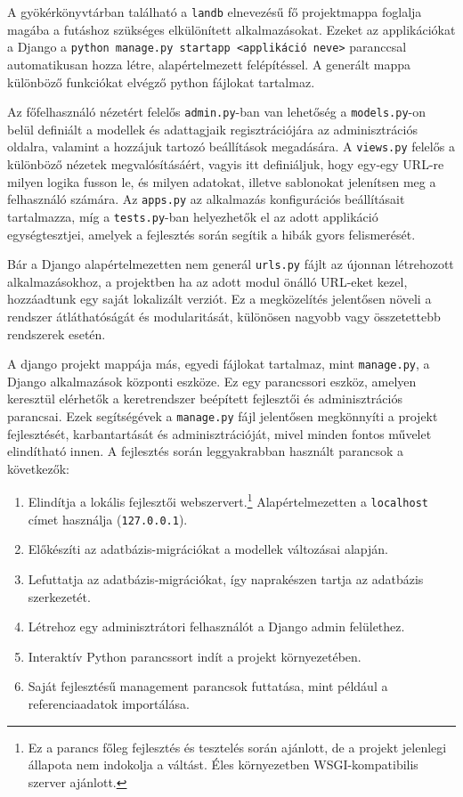 A gyökérkönyvtárban található a \texttt{landb} elnevezésű fő projektmappa foglalja magába a futáshoz szükséges elkülönített alkalmazásokat. Ezeket az applikációkat a Django a \texttt{python manage.py startapp <applikáció neve>} paranccsal automatikusan hozza létre, alapértelmezett felépítéssel. A generált mappa különböző funkciókat elvégző python fájlokat tartalmaz. 

Az főfelhasználó nézetért felelős \texttt{admin.py}-ban van lehetőség a \texttt{models.py}-on belül definiált a modellek és adattagjaik regisztrációjára az adminisztrációs oldalra, valamint a hozzájuk tartozó beállítások megadására. A \texttt{views.py} felelős a különböző nézetek megvalósításáért, vagyis itt definiáljuk, hogy egy-egy URL-re milyen logika fusson le, és milyen adatokat, illetve sablonokat jelenítsen meg a felhasználó számára. Az \texttt{apps.py} az alkalmazás konfigurációs beállításait tartalmazza, míg a \texttt{tests.py}-ban helyezhetők el az adott applikáció egységtesztjei, amelyek a fejlesztés során segítik a hibák gyors felismerését.

Bár a Django alapértelmezetten nem generál \texttt{urls.py} fájlt az újonnan létrehozott alkalmazásokhoz, a projektben ha az adott modul önálló URL-eket kezel, hozzáadtunk egy saját lokalizált verziót. Ez a megközelítés jelentősen növeli a rendszer átláthatóságát és modularitását, különösen nagyobb vagy összetettebb rendszerek esetén.

A django projekt mappája más, egyedi fájlokat tartalmaz, mint \texttt{manage.py}, a Django alkalmazások központi eszköze. Ez egy parancssori eszköz, amelyen keresztül elérhetők a keretrendszer beépített fejlesztői és adminisztrációs parancsai. Ezek segítségévek a \texttt{manage.py} fájl jelentősen megkönnyíti a projekt fejlesztését, karbantartását és adminisztrációját, mivel minden fontos művelet elindítható innen. A fejlesztés során leggyakrabban használt parancsok a következők:

\begin{enumerate}
  \item[\texttt{python manage.py runserver}] Elindítja a lokális fejlesztői webszervert.\footnote{Ez a parancs főleg fejlesztés és tesztelés során ajánlott, de a projekt jelenlegi állapota nem indokolja a váltást. Éles környezetben WSGI-kompatibilis szerver ajánlott.} Alapértelmezetten a \texttt{localhost} címet használja (\texttt{127.0.0.1}).
  \item[\texttt{python manage.py makemigrations}] Előkészíti az adatbázis-migrációkat a modellek változásai alapján.
  \item[\texttt{python manage.py migrate}] Lefuttatja az adatbázis-migrációkat, így naprakészen tartja az adatbázis szerkezetét.
  \item[\texttt{python manage.py createsuperuser}] Létrehoz egy adminisztrátori felhasználót a Django admin felülethez.
  \item[\texttt{python manage.py shell}] Interaktív Python parancssort indít a projekt környezetében.
  \item[\texttt{python manage.py <egyedi parancs neve>}] Saját fejlesztésű management parancsok futtatása, mint például a referenciaadatok importálása.
\end{enumerate}

